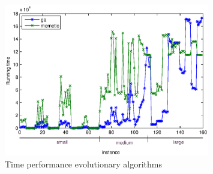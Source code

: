\begin{figure}[!htbp]
  \begin{center}
   \includegraphics[width=0.8\textwidth]{Images/Chapter5/compare_times_evol.eps}
  \end{center}
    \caption{Time performance evolutionary algorithms}\label{fig:compare_times_evol}
\end{figure}

